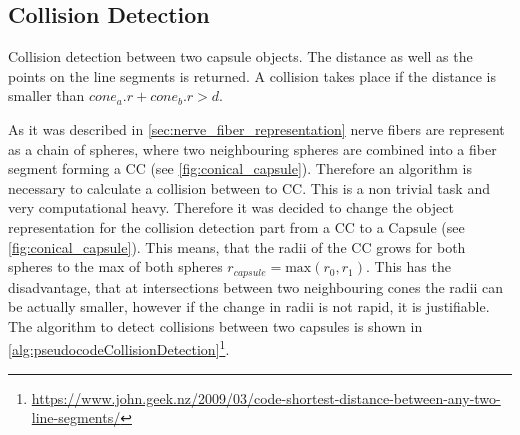 \subsection{Collision Detection}
% 
% 
\begin{lstfloat}[!t]
\caption{Collision detection between two capsule objects. The distance as well as the points on the line segments is returned. A collision takes place if the distance is smaller than $\mathit{cone_a.r}+\mathit{cone_b.r} > d$.}
\label{pseudocodeCollisionDetection}
\end{lstfloat}
% 
As it was described in \cref{sec:nerve_fiber_representation} nerve fibers are represent as a chain of spheres, where two neighbouring spheres are combined into a fiber segment forming a \ac{CC} (see \cref{fig:conical_capsule}).
% 
Therefore an algorithm is necessary to calculate a collision between to \ac{CC}.
This is a non trivial task and very computational heavy.
Therefore it was decided to change the object representation for the collision detection part from a \ac{CC} to a Capsule (see \cref{fig:conical_capsule}).
This means, that the radii of the \ac{CC} grows for both spheres to the max of both spheres $r_{\mathit{capsule}} = \mathrm{max}(r_0, r_1)$.
This has the disadvantage, that at intersections between two neighbouring cones the radii can be actually smaller, however if the change in radii is not rapid, it is justifiable.
\\
The algorithm to detect collisions between two capsules is shown in \cref{alg:pseudocodeCollisionDetection}\footnote{\href{https://www.john.geek.nz/2009/03/code-shortest-distance-between-any-two-line-segments/}{https://www.john.geek.nz/2009/03/code-shortest-distance-between-any-two-line-segments/}}.
